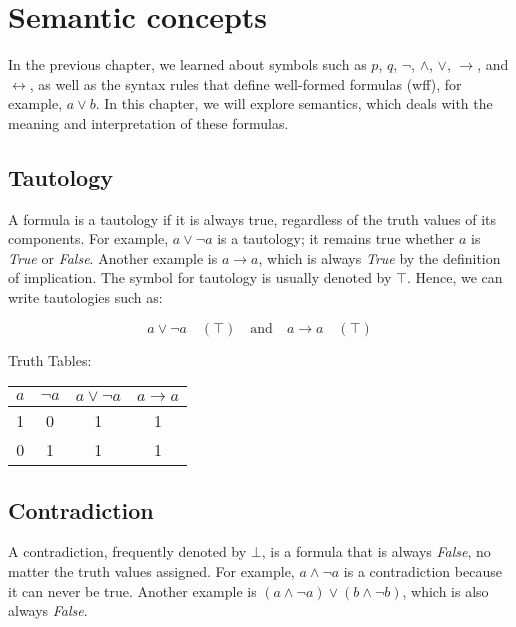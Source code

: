 \documentclass[12pt,a4paper,openany]{article}
\begin{document}

\section{Semantic concepts }

In the previous chapter, we learned about symbols such as \(p\), \(q\),
\(\neg\), \(\land\), \(\lor\), \(\to\), and \(\leftrightarrow\), as well
as the syntax rules that define well-formed formulas (wff), for example,
\(a \lor b\). In this chapter, we will explore semantics, which deals
with the meaning and interpretation of these formulas.

\subsection{Tautology}\label{tautology}

A formula is a tautology if it is always true, regardless of the truth
values of its components. For example, \(a \lor \neg a\) is a tautology;
it remains true whether \(a\) is \emph{True} or \emph{False}. Another
example is \(a \to a\), which is always \emph{True} by the definition of
implication. The symbol for tautology is usually denoted by \(\top\).
Hence, we can write tautologies such as:

\[
a \lor \neg a \quad (\top) \quad \text{and} \quad a \to a \quad (\top)
\]

Truth Tables:

\begin{center}
\begin{tabular}{|c|c|c|c|}
\hline
\(a\) & \(\neg a\) & \(a \lor \neg a\) & \(a \to a\) \\
\hline
1 & 0 & 1 & 1 \\
0 & 1 & 1 & 1 \\
\hline
\end{tabular}
\end{center}

\subsection{Contradiction}\label{contradiction}

A contradiction, frequently denoted by \(\bot\), is a formula that is
always \emph{False}, no matter the truth values assigned. For example,
\(a \land \neg a\) is a contradiction because it can never be true.
Another example is \((a \land \neg a) \lor (b \land \neg b)\), which is
also always \emph{False}.
\end{document}
